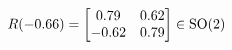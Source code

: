 \documentclass[preview]{standalone}
\begin{document}
\begin{align*}
\special{dvisvgm:raw <g id='unique000'>}R(-0.66) = \begin{bmatrix} 0.79 & 0.62 \\ -0.62 & 0.79 \end{bmatrix} \in \text{SO}(2)\special{dvisvgm:raw </g>}
\end{align*}
\end{document}
